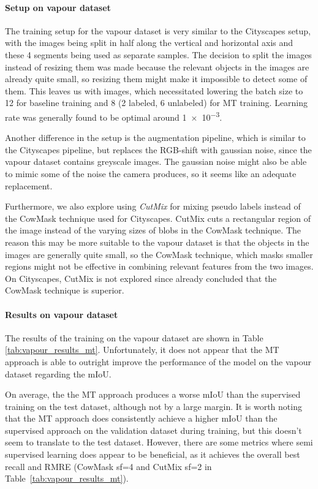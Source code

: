 \paragraph{Setup on vapour dataset}
The training setup for the vapour dataset is very similar to the Cityscapes setup, with the images being split in half along the vertical and horizontal axis and these 4 segments being used as separate samples. The decision to split the images instead of resizing them was made because the relevant objects in the images are already quite small, so resizing them might make it impossible to detect some of them. This leaves us with  images, which necessitated lowering the batch size to 12 for baseline training and 8 (2 labeled, 6 unlabeled) for MT training.
Learning rate was generally found to be optimal around \num{1e-3}.

Another difference in the setup is the augmentation pipeline, which is similar to the Cityscapes pipeline, but replaces the RGB-shift with gaussian noise, since the vapour dataset contains greyscale images. The gaussian noise might also be able to mimic some of the noise the camera produces, so it seems like an adequate replacement.

Furthermore, we also explore using \emph{CutMix}\cite{yunCutMixRegularizationStrategy2019} for mixing pseudo labels instead of the CowMask technique used for Cityscapes. 
CutMix cuts a rectangular region of the image instead of the varying sizes of blobs in the CowMask technique.
The reason this may be more suitable to the vapour dataset is that the objects in the images are generally quite small, so the CowMask technique, which masks smaller regions might not be effective in combining relevant features from the two images. On Cityscapes, CutMix is not explored since \cite{schererPseudoLabelNoiseSuppression2022} already concluded that the CowMask technique is superior.

\paragraph{Results on vapour dataset}

The results of the training on the vapour dataset are shown in Table \ref{tab:vapour_results_mt}. 
Unfortunately, it does not appear that the MT approach is able to outright improve the performance of the model on the vapour dataset regarding the mIoU.

On average, the the MT approach produces a worse mIoU than the supervised training on the test dataset, although not by a large margin. 
It is worth noting that the MT approach does consistently achieve a higher mIoU than the supervised approach on the validation dataset during training, but this doesn't seem to translate to the test dataset.
However, there are some metrics where semi supervised learning does appear to be beneficial, as it achieves the overall best recall and RMRE (CowMask sf=4 and CutMix sf=2 in Table~\ref{tab:vapour_results_mt}). 


